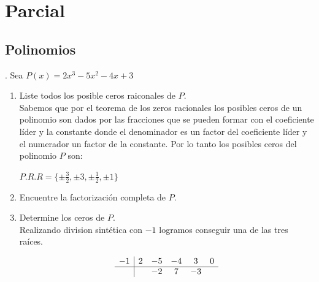 \documentclass{report}
\begin{document}
    \tableofcontents

    \pagebreak
    \chapter{ Parcial }

    \section*{Polinomios}.
        Sea $P(x) = 2x^3 - 5x^2 - 4x +3$
        \begin{enumerate}
            \item Liste todos los posible ceros raiconales de $P$.\\
                Sabemos que por el teorema de los zeros racionales los posibles ceros de un polinomio son dados por las fracciones que se pueden formar con el coeficiente líder y la constante donde el denominador es un factor del coeficiente líder y el numerador un factor de la constante. Por lo tanto los posibles ceros del polinomio $P$ son:

                $P.R.R = \{ \pm \frac{3}{2}, \pm 3, \pm \frac{1}{2}, \pm 1 \}$
            \item Encuentre la factorización completa de $P$.
            \item Determine los ceros de $P$.\\
                Realizando division sintética con $-1$ logramos conseguir una de las tres raíces.

                \[
                \begin{array}{c|ccccc}
                -1 & 2 & -5 & -4 & 3 & 0 \\
                \hline
                &  & -2 & 7 & -3  \\
                \end{array}
                \]


\end{enumerate}
\end{document}
